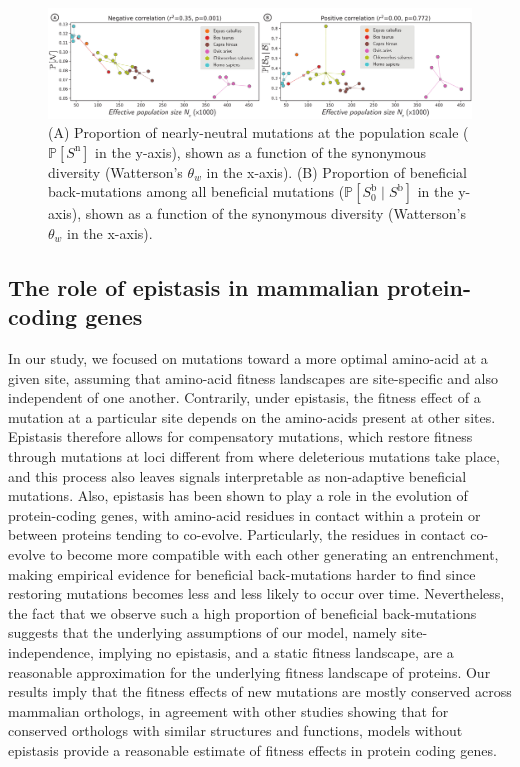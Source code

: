 \documentclass{article}
\newcommand{\proba}{\mathbb{P}}
\newcommand{\Sphy}{S_{0}}
\newcommand{\given}{\mid}
\newcommand{\Spop}{S}
\begin{document}
    \begin{figure}[!ht]
        \centering
        \includegraphics[width=\textwidth, page=1] {artworks/figure.diversity}
        \caption{
            (A) Proportion of nearly-neutral mutations at the population scale ($\proba [ \Spop^{\text{n}}]$ in the y-axis), shown as a function of the synonymous diversity (Watterson's $\theta_w$ in the x-axis).
            (B) Proportion of beneficial back-mutations among all beneficial mutations ($\proba [ \Sphy^{\text{b}}  \given  \Spop^{\text{b}}]$ in the y-axis), shown as a function of the synonymous diversity (Watterson's $\theta_w$ in the x-axis).
        }
        \label{fig:diversity}
    \end{figure}

    \subsection*{The role of epistasis in mammalian protein-coding genes}

    In our study, we focused on mutations toward a more optimal amino-acid at a given site, assuming that amino-acid fitness landscapes are site-specific and also independent of one another.
    Contrarily, under epistasis, the fitness effect of a mutation at a particular site depends on the amino-acids present at other sites.
    Epistasis therefore allows for compensatory mutations, which restore fitness through mutations at loci different from where deleterious mutations take place, and this process also leaves signals interpretable as non-adaptive beneficial mutations\cite{hartl_compensatory_1996, pollock_strong_2014, starr_epistasis_2016}.
    Also, epistasis has been shown to play a role in the evolution of protein-coding genes, with amino-acid residues in contact within a protein or between proteins tending to co-evolve\cite{breen_epistasis_2012, starr_epistasis_2016}.
    Particularly, the residues in contact co-evolve to become more compatible with each other generating an entrenchment, making empirical evidence for beneficial back-mutations harder to find since restoring mutations becomes less and less likely to occur over time\cite{goldstein_nonadaptive_2015, goldstein_sequence_2017, park_epistatic_2022}.
    Nevertheless, the fact that we observe such a high proportion of beneficial back-mutations suggests that the underlying assumptions of our model, namely site-independence, implying no epistasis, and a static fitness landscape, are a reasonable approximation for the underlying fitness landscape of proteins.
    Our results imply that the fitness effects of new mutations are mostly conserved across mammalian orthologs, in agreement with other studies showing that for conserved orthologs with similar structures and functions, models without epistasis provide a reasonable estimate of fitness effects in protein coding genes\cite{ashenberg_mutational_2013, youssef_consequences_2020}.
\end{document}

